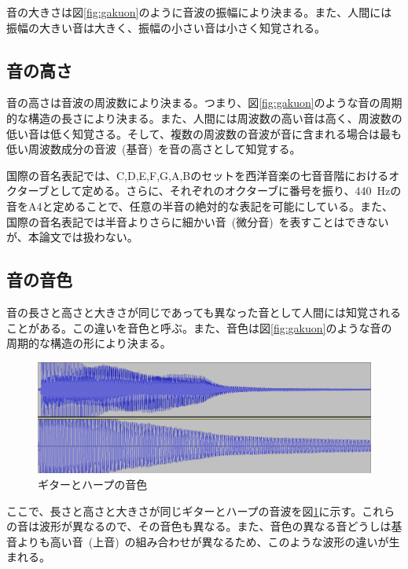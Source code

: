 音の大きさは図\ref{fig:gakuon}のように音波の振幅により決まる。また、人間には振幅の大きい音は大きく、振幅の小さい音は小さく知覚される。

\subsection{音の高さ}

音の高さは音波の周波数により決まる。つまり、図\ref{fig:gakuon}のような音の周期的な構造の長さにより決まる。また、人間には周波数の高い音は高く、周波数の低い音は低く知覚さる。そして、複数の周波数の音波が音に含まれる場合は最も低い周波数成分の音波~(基音)~を音の高さとして知覚する。

国際の音名表記では、C,D,E,F,G,A,Bのセットを西洋音楽の七音音階におけるオクターブとして定める。さらに、それぞれのオクターブに番号を振り、440~Hzの音をA4と定めることで、任意の半音の絶対的な表記を可能にしている。また、国際の音名表記では半音よりさらに細かい音~(微分音)~を表すことはできないが、本論文では扱わない。

\subsection{音の音色}

音の長さと高さと大きさが同じであっても異なった音として人間には知覚されることがある。この違いを音色と呼ぶ。また、音色は図\ref{fig:gakuon}のような音の周期的な構造の形により決まる。

\begin{figure}[b]
\begin{center}
\includegraphics[width=\hsize]{figure/c4_guitar_harp.png}
\caption{ギターとハープの音色}
\label{fig:guitar_harp_comp}
\end{center}
\end{figure}

ここで、長さと高さと大きさが同じギターとハープの音波を図\ref{fig:guitar_harp_comp}に示す。これらの音は波形が異なるので、その音色も異なる。また、音色の異なる音どうしは基音よりも高い音~(上音)~の組み合わせが異なるため、このような波形の違いが生まれる。

